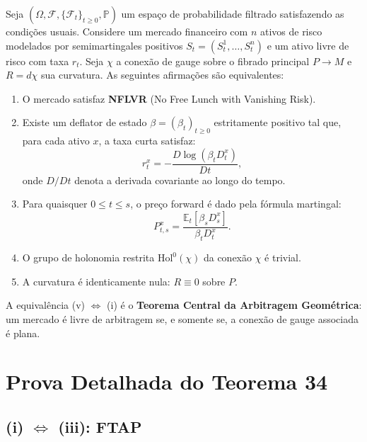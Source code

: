 \begin{teo}
Seja $(\Omega, \mathcal{F}, \{\mathcal{F}_t\}_{t \ge 0}, \mathbb{P})$ um espa\c{c}o de probabilidade filtrado satisfazendo as condi\c{c}\~oes usuais. Considere um mercado financeiro com $n$ ativos de risco modelados por semimartingales positivos $S_t = (S_t^1, \dots, S_t^n)$ e um ativo livre de risco com taxa $r_t$. Seja $\chi$ a conex\~ao de gauge sobre o fibrado principal $P \to M$ e $R = d\chi$ sua curvatura. As seguintes afirma\c{c}\~oes s\~ao equivalentes:

\begin{enumerate}
\item[(i)] O mercado satisfaz \textbf{NFLVR} (No Free Lunch with Vanishing Risk).
\item[(ii)] Existe um deflator de estado $\beta = (\beta_t)_{t \ge 0}$ estritamente positivo tal que, para cada ativo $x$, a taxa curta satisfaz:
\begin{equation}
r_t^x = -\frac{D \log(\beta_t D_t^x)}{Dt},
\end{equation}
onde $D/Dt$ denota a derivada covariante ao longo do tempo.
\item[(iii)] Para quaisquer $0 \le t \le s$, o pre\c{c}o forward \'e dado pela f\'ormula martingal:
\begin{equation}
P_{t,s}^x = \frac{\mathbb{E}_t[\beta_s D_s^x]}{\beta_t D_t^x}.
\end{equation}
\item[(iv)] O grupo de holonomia restrita $\mathrm{Hol}^0(\chi)$ da conex\~ao $\chi$ \'e trivial.
\item[(v)] A curvatura \'e identicamente nula: $R \equiv 0$ sobre $P$.
\end{enumerate}
\end{teo}

\noindent A equival\^encia (v) $\Longleftrightarrow$ (i) \'e o \textbf{Teorema Central da Arbitragem Geom\'etrica}: um mercado \'e livre de arbitragem se, e somente se, a conex\~ao de gauge associada \'e plana.

\section{Prova Detalhada do Teorema 34}

\subsection{(i) $\Longleftrightarrow$ (iii): FTAP}

